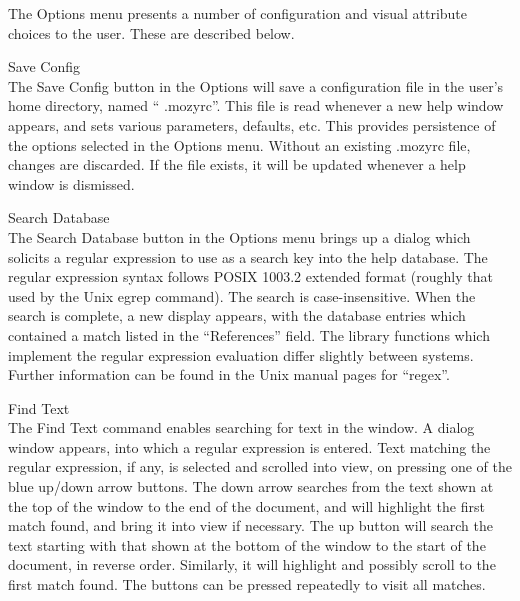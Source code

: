 The {\cb Options} menu presents a number of configuration and visual
attribute choices to the user.  These are described below.
\begin{description}

\item{\cb Save Config}\\
The {\cb Save Config} button in the {\cb Options} will save a
configuration file in the user's home directory, named ``{\vt
.mozyrc}''.  This file is read whenever a new help window appears, and
sets various parameters, defaults, etc.  This provides persistence of
the options selected in the {\cb Options} menu.  Without an existing 
{\vt .mozyrc} file, changes are discarded.  If the file exists, it
will be updated whenever a help window is dismissed.

\item{\cb Search Database}\\
The {\cb Search Database} button in the {\cb Options} menu brings up a
dialog which solicits a regular expression to use as a search key into
the help database.  The regular expression syntax follows POSIX 1003.2
extended format (roughly that used by the Unix {\vt egrep} command). 
The search is case-insensitive.  When the search is complete, a new
display appears, with the database entries which contained a match
listed in the ``References'' field.  The library functions which
implement the regular expression evaluation differ slightly between
systems.  Further information can be found in the Unix manual pages
for ``regex''.

\item{\cb Find Text}\\
The {\cb Find Text} command enables searching for text in the window. 
A dialog window appears, into which a regular expression is entered. 
Text matching the regular expression, if any, is selected and scrolled
into view, on pressing one of the blue up/down arrow buttons.  The
down arrow searches from the text shown at the top of the window to
the end of the document, and will highlight the first match found, and
bring it into view if necessary.  The up button will search the text
starting with that shown at the bottom of the window to the start of
the document, in reverse order.  Similarly, it will highlight and
possibly scroll to the first match found.  The buttons can be pressed
repeatedly to visit all matches.


\end{description}

